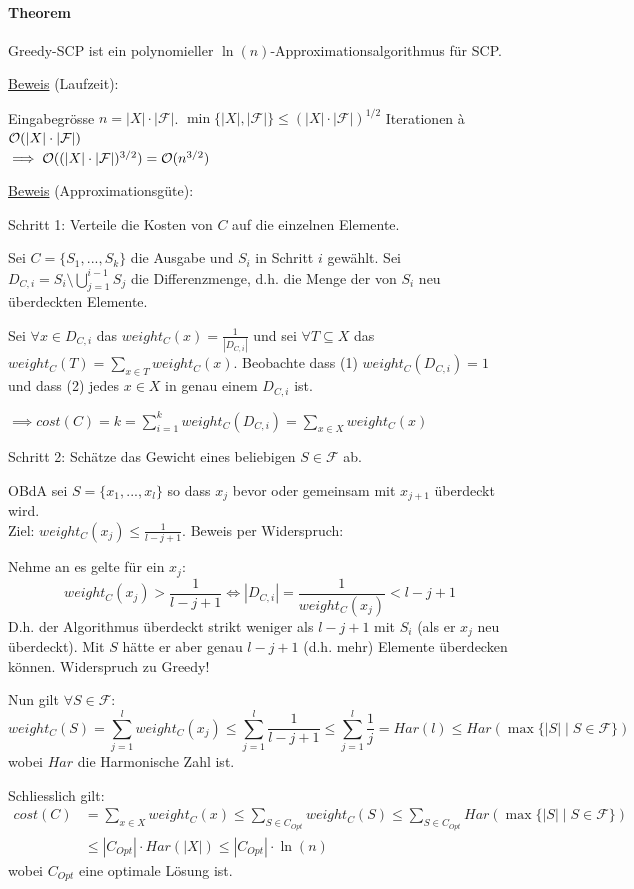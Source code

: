 \paragraph{Theorem}
Greedy-SCP ist ein polynomieller $\ln(n)$-Approximationsalgorithmus für SCP.

\underline{Beweis} (Laufzeit):

Eingabegrösse $n = |X| \cdot |\mathcal{F}|$.
$\min \{|X|, |\mathcal{F}| \} \leq (|X| \cdot |\mathcal{F}|)^{1/2}$ Iterationen
à $\mathcal{O} (|X| \cdot |\mathcal{F}|)$
\\
$\implies \mathcal{O} ((|X| \cdot |\mathcal{F}|)^{3/2}) = \mathcal{O} (n^{3/2})$

\underline{Beweis} (Approximationsgüte):

Schritt 1: Verteile die Kosten von $C$ auf die einzelnen Elemente.

Sei $C = \{ S_1, ..., S_k \}$ die Ausgabe und $S_i$ in Schritt $i$ gewählt.
Sei $D_{C,i} = S_i \setminus \bigcup_{j=1}^{i-1} S_j$ die Differenzmenge,
d.h. die Menge der von $S_i$ neu überdeckten Elemente.

Sei $\forall x \in D_{C,i}$ das $weight_C(x) = \frac{1}{|D_{C,i}|}$
und sei $\forall T \subseteq X$ das $weight_C(T) = \sum_{x \in T} weight_C(x)$.
Beobachte dass (1) $weight_C(D_{C,i}) = 1$ und dass (2) jedes $x \in X$ in genau einem $D_{C,i}$ ist.

$\implies cost(C) = k = \sum_{i=1}^k weight_C(D_{C,i}) = \sum_{x\in X} weight_C(x)$

Schritt 2: Schätze das Gewicht eines beliebigen $S \in \mathcal{F}$ ab.

OBdA sei $S= \{x_1, ..., x_l\}$ so dass $x_j$ bevor oder gemeinsam mit $x_{j+1}$ überdeckt wird. \\
Ziel: $weight_C(x_j) \leq \frac{1}{l-j+1}$.
Beweis per Widerspruch:

Nehme an es gelte für ein $x_j$:
$$ weight_C(x_j) > \frac{1}{l-j+1} \iff |D_{C,i}| = \frac{1}{weight_C(x_j)} < l-j+1 $$
D.h. der Algorithmus überdeckt strikt weniger als $l-j+1$ mit $S_i$ (als er $x_j$ neu überdeckt).
Mit $S$ hätte er aber genau $l-j+1$ (d.h. mehr) Elemente überdecken können.
Widerspruch zu Greedy!

Nun gilt $\forall S \in \mathcal{F}$:
$$ weight_C(S)
     = \sum_{j=1}^l weight_C(x_j)
  \leq \sum_{j=1}^l \frac{1}{l-j+1}
  \leq \sum_{j=1}^l \frac{1}{j}
     = Har(l)
  \leq Har(\max \{ |S| \; | \; S \in \mathcal{F} \} )
$$
wobei $Har$ die Harmonische Zahl ist.

Schliesslich gilt:
\begin{align*}
  cost(C)
     &= \sum_{x \in X} weight_C(x) %
  \leq \sum_{S \in C_{Opt}} weight_C(S) %
  \leq \sum_{S \in C_{Opt}} Har(\max \{ |S| \; | \; S \in \mathcal{F} \} ) \\
  &\leq |C_{Opt}| \cdot Har(|X|)
  \leq |C_{Opt}| \cdot \ln(n)
\end{align*}
wobei $C_{Opt}$ eine optimale Lösung ist.

